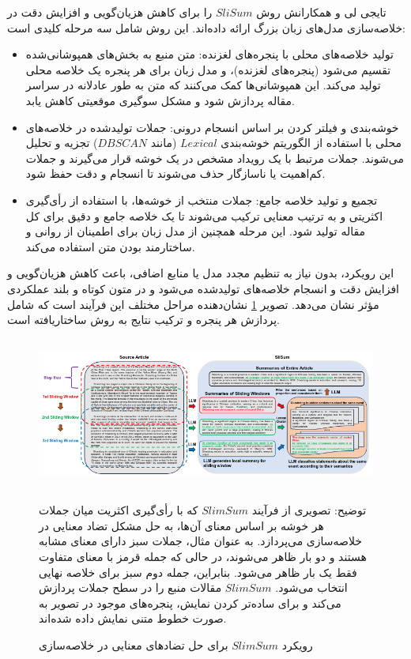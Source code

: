  تایجی لی و همکارانش روش $SliSum$ را برای کاهش هزیان‌گویی و افزایش دقت در خلاصه‌سازی مدل‌های زبان بزرگ ارائه داده‌اند. این روش شامل سه مرحله کلیدی است:
\begin{itemize}
	\item 
تولید خلاصه‌های محلی با پنجره‌های لغزنده: متن منبع به بخش‌های همپوشانی‌شده تقسیم می‌شود (پنجره‌های لغزنده)، و مدل زبان برای هر پنجره یک خلاصه محلی تولید می‌کند. این همپوشانی‌ها کمک می‌کنند که متن به طور عادلانه در سراسر مقاله پردازش شود و مشکل سوگیری موقعیتی کاهش یابد.
\item 
خوشه‌بندی و فیلتر کردن بر اساس انسجام درونی: جملات تولیدشده در خلاصه‌های محلی با استفاده از الگوریتم خوشه‌بندی $Lexical$ (مانند $DBSCAN$) تجزیه و تحلیل می‌شوند. جملات مرتبط با یک رویداد مشخص در یک خوشه قرار می‌گیرند و جملات کم‌اهمیت یا ناسازگار حذف می‌شوند تا انسجام و دقت حفظ شود.
\item 
تجمیع و تولید خلاصه جامع: جملات منتخب از خوشه‌ها، با استفاده از رأی‌گیری اکثریتی و به ترتیب معنایی ترکیب می‌شوند تا یک خلاصه جامع و دقیق برای کل مقاله تولید شود. این مرحله همچنین از مدل زبان برای اطمینان از روانی و ساختارمند بودن متن استفاده می‌کند.
\end{itemize}
این رویکرد، بدون نیاز به تنظیم مجدد مدل یا منابع اضافی، باعث کاهش هزیان‌گویی و افزایش دقت و انسجام خلاصه‌های تولیدشده می‌شود و در متون کوتاه و بلند عملکردی مؤثر نشان می‌دهد. تصویر \ref{fig:slimsum} نشان‌دهنده مراحل مختلف این فرآیند است که شامل پردازش هر پنجره و ترکیب نتایج به روش ساختاریافته است\cite{li-etal-2024-improving-faithfulness}.

\begin{figure}[!h]
	\begin{center}
		\includegraphics[height=5cm]{slimsum.png}
	\end{center}
	\caption{  رویکرد $SlimSum$ برای حل تضادهای معنایی در خلاصه‌سازی }
	\small{
		
		توضیح: تصویری از فرآیند $SlimSum$ که با رأی‌گیری اکثریت میان جملات هر خوشه بر اساس معنای آن‌ها، به حل مشکل تضاد معنایی در خلاصه‌سازی می‌پردازد. به عنوان مثال، جملات سبز دارای معنای مشابه هستند و دو بار ظاهر می‌شوند، در حالی که جمله قرمز با معنای متفاوت فقط یک بار ظاهر می‌شود. بنابراین، جمله دوم سبز برای خلاصه نهایی انتخاب می‌شود. $SlimSum$ مقالات منبع را در سطح جملات پردازش می‌کند و برای ساده‌تر کردن نمایش، پنجره‌های موجود در تصویر به صورت خطوط متنی نمایش داده شده‌اند\cite{li-etal-2024-improving-faithfulness}. }
	\label{fig:slimsum}
	
	\medskip
	
\end{figure}




